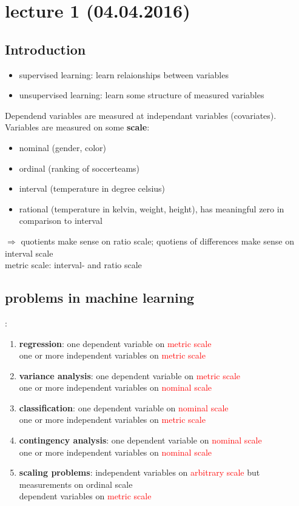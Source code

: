 \section*{lecture 1 (04.04.2016)}
\subsection*{Introduction}

\begin{itemize}
 \item supervised learning: learn relaionships between variables
 \item unsupervised learning: learn some structure of measured variables
\end{itemize}

Dependend variables are measured at independant variables (covariates). Variables are measured on some \textbf{scale}:

\begin{itemize}
 \item nominal (gender, color)
 \item ordinal (ranking of soccerteams)
 \item interval (temperature in degree celsius)
 \item rational (temperature in kelvin, weight, height), has meaningful zero in comparison to interval
\end{itemize}

$\Rightarrow$ quotients make sense on ratio scale; quotiens of differences make sense on interval scale\\
metric scale: interval- and ratio scale  \\

\subsection*{problems in machine learning}:
\begin{enumerate}[1.]
 \item \textbf{regression}: one dependent variable on \textcolor{red}{metric scale}\\
 one or more independent variables on \textcolor{red}{metric scale}
 \item \textbf{variance analysis}: one dependent variable on \textcolor{red}{metric scale}\\
 one or more independent variables on \textcolor{red}{nominal scale}
 \item \textbf{classification}: one dependent variable on \textcolor{red}{nominal scale}\\
 one or more independent variables on \textcolor{red}{metric scale}
 \item \textbf{contingency analysis}: one dependent variable on \textcolor{red}{nominal scale}\\
 one or more independent variables on \textcolor{red}{nominal scale}
 \item \textbf{scaling problems}: independent variables on \textcolor{red}{arbitrary scale} but measurements on ordinal scale\\
 dependent variables on \textcolor{red}{metric scale}
\end{enumerate}

